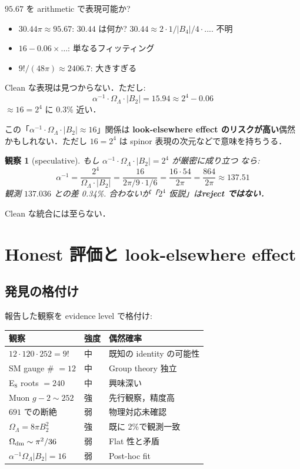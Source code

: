 \documentclass[11pt,a4paper]{article}
\newtheorem{observation}{観察}
\begin{document}
$95.67$ を arithmetic で表現可能か?
\begin{itemize}
\item $30.44 \pi \approx 95.67$: $30.44$ は何か? $30.44 \approx 2 \cdot 1/|B_4|/4 \cdot ...$. 不明
\item $16 - 0.06 \times \ldots$: 単なるフィッティング
\item $9!/(48\pi) \approx 2406.7$: 大きすぎる
\end{itemize}

Clean な表現は見つからない．ただし:
\begin{equation}
\alpha^{-1} \cdot \Omega_\Lambda \cdot |B_2| = 15.94 \approx 2^4 - 0.06
\end{equation}
$\approx 16 = 2^4$ に 0.3\% 近い．

この「$\alpha^{-1} \cdot \Omega_\Lambda \cdot |B_2| \approx 16$」関係は
\textbf{look-elsewhere effect のリスクが高い}偶然かもしれない．ただし
$16 = 2^4$ は spinor 表現の次元などで意味を持ちうる．

\begin{observation}[speculative]
もし $\alpha^{-1} \cdot \Omega_\Lambda \cdot |B_2| = 2^4$ が厳密に成り立つ
なら:
\begin{equation}
\alpha^{-1} = \frac{2^4}{\Omega_\Lambda \cdot |B_2|} = \frac{16}{2\pi/9 \cdot 1/6}
= \frac{16 \cdot 54}{2\pi} = \frac{864}{2\pi} \approx 137.51
\end{equation}
観測 $137.036$ との差 0.34\%. 合わないが「$2^4$ 仮説」は\textbf{reject
ではない}．
\end{observation}

Clean な統合には至らない．

\section{Honest 評価と look-elsewhere effect}

\subsection{発見の格付け}

報告した観察を evidence level で格付け:

\begin{center}
\begin{tabular}{lll}
\toprule
観察 & 強度 & 偶然確率 \\
\midrule
$12 \cdot 120 \cdot 252 = 9!$ & 中 & 既知の identity の可能性 \\
SM gauge \# $= 12$ & 中 & Group theory 独立 \\
E$_8$ roots $= 240$ & 中 & 興味深い \\
Muon $g-2 \sim 252$ & 強 & 先行観察，精度高 \\
$691$ での断絶 & 弱 & 物理対応未確認 \\
$\Omega_\Lambda = 8\pi B_2^2$ & 強 & 既に 2\%で観測一致 \\
$\Omega_{\rm dm} \sim \pi^2/36$ & 弱 & Flat 性と矛盾 \\
$\alpha^{-1}\Omega_\Lambda |B_2| = 16$ & 弱 & Post-hoc fit \\
\bottomrule
\end{tabular}
\end{center}
\end{document}
